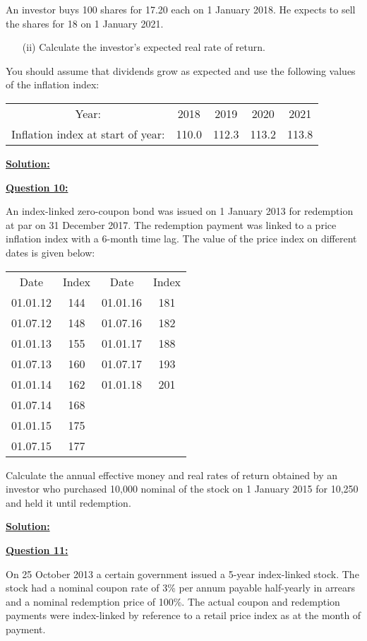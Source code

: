 \documentclass[11pt, answers]{exam}
\begin{document}
An investor buys 100 shares for 17.20 each on 1 January 2018. He expects to sell the shares for 18 on 1 January 2021.
\begin{itemize}
\item[(ii)] Calculate the investor’s expected real rate of return.
\end{itemize}
You should assume that dividends grow as expected and use the following values of the inflation index:
\begin{table}[h]
\centering
\begin{tabular}{ccccc}

Year: & 2018 & 2019 & 2020 & 2021 \\
Inflation index at start of year: & 110.0 & 112.3 & 113.2 & 113.8
\end{tabular}
\end{table}
\bigskip

\underline{\textbf{Solution:}}\bigskip


\underline{\textbf{Question 10:}}\bigskip

 An index-linked zero-coupon bond was issued on 1 January 2013 for redemption at par on
31 December 2017. The redemption payment was linked to a price inflation index with a 6-month time lag. The value of the price index on different dates is given below:
\begin{table}[h]
\centering
\begin{tabular}{cccc}
Date & Index & Date & Index  \\
01.01.12 & 144 &01.01.16 & 181 \\
01.07.12 & 148 &01.07.16 & 182 \\
01.01.13 & 155 &01.01.17 & 188 \\
01.07.13 & 160 &01.07.17 & 193 \\
01.01.14 & 162 &01.01.18 & 201 \\
01.07.14 & 168 &~&~\\	
01.01.15 & 175 &~&~\\
01.07.15 & 177 &~&~\\
\end{tabular}
\end{table}
Calculate the annual effective money and real rates of return obtained by an investor who purchased 10,000 nominal of the stock on 1 January 2015 for 10,250 and held it until redemption.


\underline{\textbf{Solution:}}\bigskip

\underline{\textbf{Question 11:}}\bigskip

On 25 October 2013 a certain government issued a 5-year index-linked stock. The stock had a
nominal coupon rate of 3\% per annum payable half-yearly in arrears and a nominal redemption price of 100\%. The actual coupon and redemption payments were index-linked by reference to a retail price index as at the month of payment.
\end{document}
